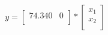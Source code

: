 \begin{equation}
	y
=
\begin{bmatrix}
74.340      &  0  \\
\end{bmatrix}
*
\begin{bmatrix}
x_1   \\
x_2   \\
\end{bmatrix}
\label{eq:StateSpaceC}
\end{equation}


\newpage